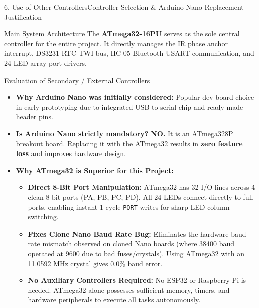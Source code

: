 \documentclass[aspectratio=169, 10pt]{beamer}
\begin{document}
\begin{frame}{6. Use of Other Controllers}{Controller Selection \& Arduino Nano Replacement Justification}
    \begin{block}{Main System Architecture}
        \scriptsize The \textbf{ATmega32-16PU} serves as the sole central controller for the entire project. It directly manages the IR phase anchor interrupt, DS3231 RTC TWI bus, HC-05 Bluetooth USART communication, and 24-LED array port drivers.
    \end{block}
    \vspace{-0.1cm}
    \begin{block}{Evaluation of Secondary / External Controllers}
        \scriptsize
        \begin{itemize}
            \item \textbf{Why Arduino Nano was initially considered:} Popular dev-board choice in early prototyping due to integrated USB-to-serial chip and ready-made header pins.
            \item \textbf{Is Arduino Nano strictly mandatory?} \textbf{NO.} It is an ATmega328P breakout board. Replacing it with the ATmega32 results in \textbf{zero feature loss} and improves hardware design.
            \item \textbf{Why ATmega32 is Superior for this Project:}
                \begin{itemize}
                    \tiny
                    \item \textbf{Direct 8-Bit Port Manipulation:} ATmega32 has 32 I/O lines across 4 clean 8-bit ports (PA, PB, PC, PD). All 24 LEDs connect directly to full ports, enabling instant 1-cycle \texttt{PORT} writes for sharp LED column switching.
                    \item \textbf{Fixes Clone Nano Baud Rate Bug:} Eliminates the hardware baud rate mismatch observed on cloned Nano boards (where 38400 baud operated at 9600 due to bad fuses/crystals). Using ATmega32 with an 11.0592 MHz crystal gives 0.0\% baud error.
                    \item \textbf{No Auxiliary Controllers Required:} No ESP32 or Raspberry Pi is needed. ATmega32 alone possesses sufficient memory, timers, and hardware peripherals to execute all tasks autonomously.
                \end{itemize}
        \end{itemize}
    \end{block}
\end{frame}
\end{document}
